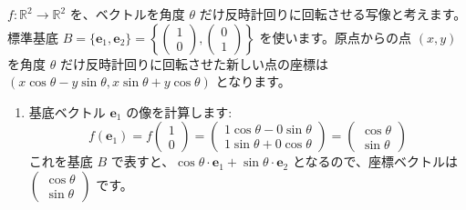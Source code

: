 \begin{ex}[2次元平面上の回転写像の表現行列]
$f: \mathbb{R}^2 \to \mathbb{R}^2$ を、ベクトルを角度 $\theta$ だけ反時計回りに回転させる写像と考えます。標準基底 $B = \{\bm{e}_1, \bm{e}_2\} = \left\{ \begin{pmatrix} 1 \\ 0 \end{pmatrix}, \begin{pmatrix} 0 \\ 1 \end{pmatrix} \right\}$ を使います。原点からの点 $(x, y)$ を角度 $\theta$ だけ反時計回りに回転させた新しい点の座標は $(x\cos\theta - y\sin\theta, x\sin\theta + y\cos\theta)$ となります。
\begin{enumerate}
\item 基底ベクトル $\bm{e}_1$ の像を計算します:
    \[f(\bm{e}_1) = f\begin{pmatrix} 1 \\ 0 \end{pmatrix} = \begin{pmatrix} 1\cos\theta - 0\sin\theta \\ 1\sin\theta + 0\cos\theta \end{pmatrix} = \begin{pmatrix} \cos\theta \\ \sin\theta \end{pmatrix}\]
    これを基底 $B$ で表すと、$\cos\theta \cdot \bm{e}_1 + \sin\theta \cdot \bm{e}_2$ となるので、座標ベクトルは $\begin{pmatrix} \cos\theta \\ \sin\theta \end{pmatrix}$ です。


\end{enumerate}
\end{ex}
